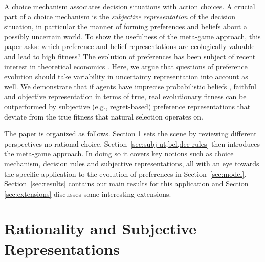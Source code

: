 \documentclass[fleqn,reqno,12pt]{article}
\theoremstyle{Satz}
\theoremstyle{Bsp}
\begin{document}
A choice mechanism associates decision situations with action choices. A crucial part of a
choice mechanism is the \emph{subjective representation} of the decision situation, in
particular the manner of forming preferences and beliefs about a possibly uncertain world. To
show the usefulness of the meta-game approach, this paper asks: which preference and belief
representations are ecologically valuable and lead to high fitness? The evolution of
preferences has been subject of recent interest in theoretical economics
\citep[e.g.,][]{algweib13,DekElyYlan07,RobSam11}. Here, we argue that questions of preference
evolution should take variability in uncertainty representation into account as well. We
demonstrate that if agents have imprecise probabilistic beliefs
\citep[e.g.][]{gardsah82,levi74,walley96}, faithful and objective representation in terms of
true, real evolutionary fitness can be outperformed by subjective (e.g., regret-based)
preference representations that deviate from the true fitness that natural selection operates
on.


The paper is organized as follows. Section \ref{sec:rati--subj} sets the scene by reviewing
different perspectives no rational choice. Section~\ref{sec:subj-ut,bel,dec-rules} then
introduces the meta-game approach. In doing so it covers key notions such as choice mechanism,
decision rules and subjective representations, all with an eye towards the specific application
to the evolution of preferences in Section~\ref{sec:model}. Section~\ref{sec:results} contains
our main results for this application and Section \ref{sec:extensions} discusses some
interesting extensions.

\section{Rationality and Subjective Representations}
\label{sec:rati--subj}
\end{document}
